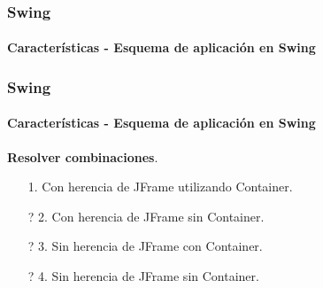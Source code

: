 \documentclass{beamer}
\begin{document}
    \begin{frame}
		\frametitle{Swing}
		\framesubtitle{Caracter\'isticas - Esquema de aplicaci\'on en Swing}

    		\begin{center}
		\end{center}
	\end{frame}

    \begin{frame}
		\frametitle{Swing}
		\framesubtitle{Caracter\'isticas - Esquema de aplicaci\'on en Swing}

		\textbf{Resolver combinaciones}.
		\begin{itemize}
		    \item[\checkmark] 1. Con herencia de JFrame utilizando Container.
		    \item[?] 2. Con herencia de JFrame sin Container.
		    \item[?] 3. Sin herencia de JFrame con Container.
		    \item[?] 4. Sin herencia de JFrame sin Container.
		\end{itemize}
	\end{frame}
\end{document}
